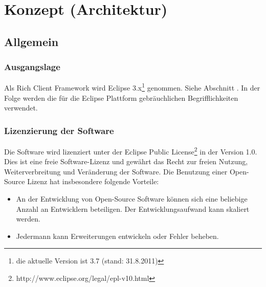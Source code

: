 \chapter{Konzept (Architektur)}\label{konzept_1}
\section{Allgemein}
\subsection{Ausgangslage}
Als Rich Client Framework wird Eclipse 3.x\footnote{die aktuelle Version ist 3.7 (stand: 31.8.2011)} genommen. Siehe Abschnitt . In der Folge werden die für die Eclipse Plattform gebräuchlichen Begrifflichkeiten verwendet. 

\subsection{Lizenzierung der Software}
Die Software wird lizenziert unter der Eclipse Public License\footnote{http://www.eclipse.org/legal/epl-v10.html} in der Version 1.0. Dies ist eine freie Software-Lizenz und gewährt das Recht zur freien Nutzung, Weiterverbreitung und Veränderung der Software. Die Benutzung einer Open-Source Lizenz hat insbesondere folgende Vorteile:
\begin{itemize}
	\item An der Entwicklung von Open-Source Software können sich eine beliebige Anzahl an Entwicklern beteiligen. Der Entwicklungsaufwand kann skaliert werden.
	\item Jedermann kann Erweiterungen entwickeln oder Fehler beheben.
\end{itemize}

